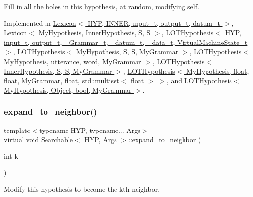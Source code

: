 Fill in all the holes in this hypothesis, at random, modifying self. 



Implemented in \hyperlink{class_lexicon_a724ccdaffe9090488bfaa786873fa807}{Lexicon$<$ H\+Y\+P, I\+N\+N\+E\+R, input\+\_\+t, output\+\_\+t, datum\+\_\+t $>$}, \hyperlink{class_lexicon_a724ccdaffe9090488bfaa786873fa807}{Lexicon$<$ My\+Hypothesis, Inner\+Hypothesis, S, S $>$}, \hyperlink{class_l_o_t_hypothesis_a7f913b702b434003f94a84c560d16bf9}{L\+O\+T\+Hypothesis$<$ H\+Y\+P, input\+\_\+t, output\+\_\+t, \+\_\+\+Grammar\+\_\+t, \+\_\+datum\+\_\+t, \+\_\+data\+\_\+t, Virtual\+Machine\+State\+\_\+t $>$}, \hyperlink{class_l_o_t_hypothesis_a7f913b702b434003f94a84c560d16bf9}{L\+O\+T\+Hypothesis$<$ My\+Hypothesis, S, S, My\+Grammar $>$}, \hyperlink{class_l_o_t_hypothesis_a7f913b702b434003f94a84c560d16bf9}{L\+O\+T\+Hypothesis$<$ My\+Hypothesis, utterance, word, My\+Grammar $>$}, \hyperlink{class_l_o_t_hypothesis_a7f913b702b434003f94a84c560d16bf9}{L\+O\+T\+Hypothesis$<$ Inner\+Hypothesis, S, S, My\+Grammar $>$}, \hyperlink{class_l_o_t_hypothesis_a7f913b702b434003f94a84c560d16bf9}{L\+O\+T\+Hypothesis$<$ My\+Hypothesis, float, float, My\+Grammar, float, std\+::multiset$<$ float $>$ $>$}, and \hyperlink{class_l_o_t_hypothesis_a7f913b702b434003f94a84c560d16bf9}{L\+O\+T\+Hypothesis$<$ My\+Hypothesis, Object, bool, My\+Grammar $>$}.

\mbox{\label{class_searchable_a1786307b9f2dadc8c66c94adef220270}} 
\subsubsection{\texorpdfstring{expand\+\_\+to\+\_\+neighbor()}{expand\_to\_neighbor()}}
{\footnotesize\ttfamily template$<$typename H\+YP, typename... Args$>$ \\
virtual void \hyperlink{class_searchable}{Searchable}$<$ H\+YP, Args $>$\+::expand\+\_\+to\+\_\+neighbor (\begin{DoxyParamCaption}\item[{int}]{k }\end{DoxyParamCaption})\hspace{0.3cm}{\ttfamily [pure virtual]}}



Modify this hypothesis to become the k\textquotesingle{}th neighbor. 


